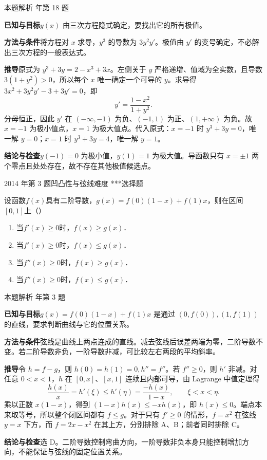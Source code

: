 \documentclass[UTF8,zihao=-4,fontset=fandol]{ctexart}
\newcommand{\pickout}{\hfill（\hspace{1.4em}）}
\newenvironment{abcd}{\begin{enumerate}[label=\textup{(\Alph*)},leftmargin=2.3em,itemsep=1pt,topsep=4pt,parsep=1pt]}{\end{enumerate}}
\newcounter{BankQuestion}
\newcommand{\QuestionPage}[7]{%
  \stepcounter{BankQuestion}%
  \par\noindent\begin{minipage}{\linewidth}
  \raggedright
  {\small\textcolor{black!60}{#3\quad #5\quad 难度 #7}\hfill\textcolor{accent}{#2}}\par\smallskip}
\newcommand{\QuestionEnd}{\end{minipage}\par\medskip}
\newcommand{\QuestionPage}[7]{%
  \clearpage
  \stepcounter{BankQuestion}%
  {\small\textcolor{accent}{#1\hfill #2}}\par\medskip
  {\small\textcolor{black!60}{#3\quad #5\quad 难度 #7\hfill \arabic{BankQuestion} / 234}}\par\vspace{9bp}}
\newcommand{\QuestionEnd}{}
\newenvironment{QuestionSolution}[1]{%
  \clearpage
  {\small\textcolor{black!60}{本题解析\quad #1}}\par\medskip
}{\par\clearpage}
\begin{document}
\begin{QuestionSolution}{2017 年第 18 题}
\textbf{已知与目标}\quad \(y(x)\) 由三次方程隐式确定，要找出它的所有极值。

\textbf{方法与条件}\quad 将方程对 \(x\) 求导，\(y^3\) 的导数为 \(3y^2y'\)。极值由 \(y'\) 的变号确定，不必解出三次方程的一般表达式。

\textbf{推导}\quad 原式为 \(y^3+3y=2-x^3+3x\)。左侧关于 \(y\) 严格递增、值域为全实数，且导数 \(3(1+y^2)>0\)，所以每个 \(x\) 唯一确定一个可导的 \(y\)。求导得 \(3x^2+3y^2y'-3+3y'=0\)，即
\[
y'=\frac{1-x^2}{1+y^2}.
\]
分母恒正，因此 \(y'\) 在 \((-\infty,-1)\) 为负、\((-1,1)\) 为正、\((1,+\infty)\) 为负。故 \(x=-1\) 为极小值点，\(x=1\) 为极大值点。代入原式：\(x=-1\) 时 \(y^3+3y=0\)，唯一解 \(y=0\)；\(x=1\) 时 \(y^3+3y=4\)，唯一解 \(y=1\)。

\textbf{结论与检查}\quad \(\boxed{y(-1)=0}\) 为极小值，\(\boxed{y(1)=1}\) 为极大值。导函数只有 \(x=\pm1\) 两个零点且处处存在，故不存在其他极值候选点。
\end{QuestionSolution}

\QuestionPage{2.6 函数性态的研究}{选择题}{2014 年第 3 题}{1}{凹凸性与弦线}{106 / 234}{***}
设函数$f(x)$具有二阶导数，$g(x) = f(0)(1 - x) + f(1)x$，则在区间$[0,1]$上\pickout{}
\begin{abcd}
\item 当$f'(x) \ge 0$时，$f(x) \ge g(x)$．
\item 当$f'(x) \ge 0$时，$f(x) \le g(x)$．
\item 当$f''(x) \ge 0$时，$f(x) \ge g(x)$．
\item 当$f''(x) \ge 0$时，$f(x) \le g(x)$．
\end{abcd}
\QuestionEnd

\begin{QuestionSolution}{2014 年第 3 题}
\textbf{已知与目标}\quad \(g(x)=f(0)(1-x)+f(1)x\) 是通过 \((0,f(0)),(1,f(1))\) 的直线，要求判断曲线与它的位置关系。

\textbf{方法与条件}\quad 弦线是曲线上两点连成的直线。减去弦线后误差两端为零，二阶导数不变。若二阶导数非负，一阶导数非减，可比较左右两段的平均斜率。

\textbf{推导}\quad 令 \(h=f-g\)，则 \(h(0)=h(1)=0,h''=f''\)。若 \(f''\ge0\)，则 \(h'\) 非减。对任意 \(0<x<1\)，\(h\) 在 \([0,x]\)、\([x,1]\) 连续且内部可导，由 Lagrange 中值定理得
\[
\frac{h(x)}x=h'(\xi)\le h'(\eta)=\frac{-h(x)}{1-x},
\qquad \xi<x<\eta.
\]
乘以正数 \(x(1-x)\)，得到 \((1-x)h(x)\le-xh(x)\)，即 \(h(x)\le0\)。端点本来取等号，所以整个闭区间都有 \(f\le g\)。对于只有 \(f'\ge0\) 的情形，\(f=x^2\) 在弦线 \(y=x\) 下方，而 \(f=2x-x^2\) 在其上方，分别排除 A、B；前者同时排除 C。

\textbf{结论与检查}\quad 选 \(\boxed{\mathrm D}\)。二阶导数控制弯曲方向，一阶导数非负本身只能控制增加方向，不能保证与弦线的固定位置关系。
\end{QuestionSolution}
\end{document}

